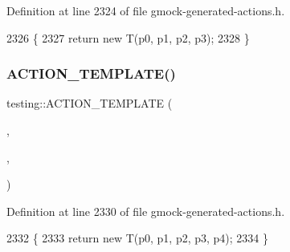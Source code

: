 Definition at line 2324 of file gmock-\/generated-\/actions.\+h.


\begin{DoxyCode}
2326                                                     \{
2327   \textcolor{keywordflow}{return} \textcolor{keyword}{new} T(p0, p1, p2, p3);
2328 \}
\end{DoxyCode}
\mbox{\label{namespacetesting_a0c03444379adfb849db243829946c1ed}} 
\subsubsection{\texorpdfstring{A\+C\+T\+I\+O\+N\+\_\+\+T\+E\+M\+P\+L\+A\+T\+E()}{ACTION\_TEMPLATE()}\hspace{0.1cm}{\footnotesize\ttfamily [23/28]}}
{\footnotesize\ttfamily testing\+::\+A\+C\+T\+I\+O\+N\+\_\+\+T\+E\+M\+P\+L\+A\+TE (\begin{DoxyParamCaption}\item[{Return\+New}]{,  }\item[{H\+A\+S\+\_\+1\+\_\+\+T\+E\+M\+P\+L\+A\+T\+E\+\_\+\+P\+A\+R\+A\+MS(typename, T)}]{,  }\item[{A\+N\+D\+\_\+5\+\_\+\+V\+A\+L\+U\+E\+\_\+\+P\+A\+R\+A\+MS(p0, p1, p2, p3, p4)}]{ }\end{DoxyParamCaption})}



Definition at line 2330 of file gmock-\/generated-\/actions.\+h.


\begin{DoxyCode}
2332                                                         \{
2333   \textcolor{keywordflow}{return} \textcolor{keyword}{new} T(p0, p1, p2, p3, p4);
2334 \}
\end{DoxyCode}
\mbox{\label{namespacetesting_a2ef1b31693ee2be0bb93602b375fb9ce}} 
